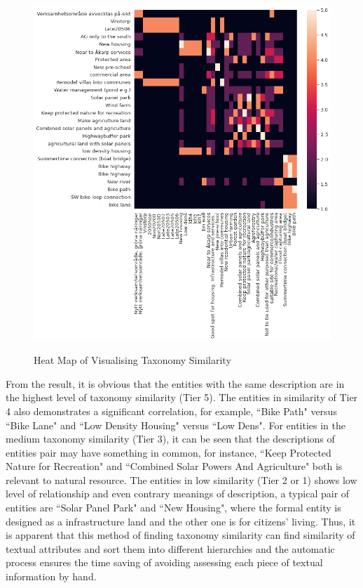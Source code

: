 \begin{figure}[H]
\caption{Heat Map of Visualising Taxonomy Similarity}
\centering
\includegraphics[scale=0.45]{tax_sim.png}
\label{tax_sim}
\end{figure}
\par
From the result, it is obvious that the entities with the same description are in the highest level of taxonomy similarity (Tier 5). The entities in similarity of Tier 4 also demonstrates a significant correlation, for example, ``Bike Path" versus ``Bike Lane" and ``Low Density Housing" versus ``Low Dens". For entities in the medium taxonomy similarity (Tier 3), it can be seen that the descriptions of entities pair may have something in common, for instance, ``Keep Protected Nature for Recreation" and ``Combined Solar Powers And Agriculture" both is relevant to natural resource. The entities in low similarity (Tier 2 or 1) shows low level of relationship and even contrary meanings of description, a typical pair of entities are ``Solar Panel Park" and ``New Housing", where the formal entity is designed as a infrastructure land and the other one is for citizens' living. Thus, it is apparent that this method of finding taxonomy similarity can find similarity of textual attributes and sort them into different hierarchies and the automatic process ensures the time saving of avoiding assessing each piece of textual information by hand. 
